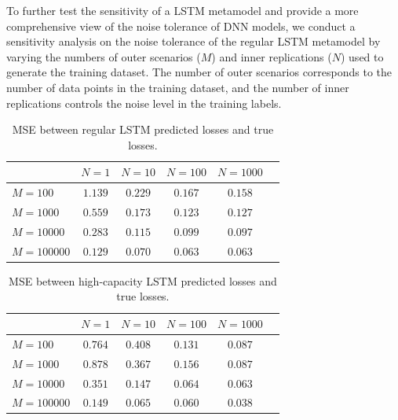 To further test the sensitivity of a LSTM metamodel and provide a more comprehensive view of the noise tolerance of DNN models, we conduct a sensitivity analysis on the noise tolerance of the regular LSTM metamodel by varying the numbers of outer scenarios ($M$) and inner replications ($N$) used to generate the training dataset.
The number of outer scenarios corresponds to the number of data points in the training dataset, and the number of inner replications controls the noise level in the training labels.

\begin{table}[ht!]
    \small
    \centering
    \begin{tabular}{lccccc}
        \toprule
                            & $N=\num{1}$ & $N=\num{10}$  & $N=\num{100}$ & $N=\num{1000}$\\
        \midrule
        $M = \num{100}$      & $1.139$ & $0.229$ & $0.167$ & $0.158$ \\
        $M = \num{1000}$     & $0.559$ & $0.173$ & $0.123$ & $0.127$ \\
        $M = \num{10000}$    & $0.283$ & $0.115$ & $0.099$ & $0.097$ \\
        $M = \num{100000}$   & $0.129$ & $0.070$ & $0.063$ & $0.063$ \\
        \bottomrule
    \end{tabular}
    \caption{MSE between regular LSTM predicted losses and true losses.}
    \label{tab2:lstm_sens}
\end{table}

\begin{table}[ht!]
    \small
    \centering
    \begin{tabular}{lccccc}
        \toprule
                          & $N=\num{1}$ & $N=\num{10}$  & $N=\num{100}$ & $N=\num{1000}$\\
        \midrule
        $M = \num{100}$      & $0.764$ & $0.408$ & $0.131$ & $0.087$ \\
        $M = \num{1000}$     & $0.878$ & $0.367$ & $0.156$ & $0.087$ \\
        $M = \num{10000}$    & $0.351$ & $0.147$ & $0.064$ & $0.063$ \\
        $M = \num{100000}$   & $0.149$ & $0.065$ & $0.060$ & $0.038$ \\
        \bottomrule
    \end{tabular}
    \caption{MSE between high-capacity LSTM predicted losses and true losses.}
    \label{tab2:hicaplstm_sens}
\end{table}


